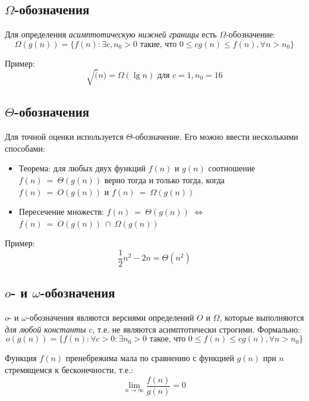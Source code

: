 \documentclass[a4paper,11pt]{article}
\begin{document}
\subsection{$\Omega$-обозначения}

Для определения \emph{асимптотическую нижней границы} есть $\Omega$-обозначение:
\begin{equation*}
  \Omega(g(n)) = \{f(n): \exists c, n_0 > 0 \text{ такие, что }
  0 \leqslant c g(n) \leqslant f(n), \forall n > n_0
  \}
\end{equation*}

Пример:
\begin{equation*}
  \sqrt(n) = \Omega(\lg n) \text{ для } c = 1, n_0 = 16
\end{equation*}

\subsection{$\Theta$-обозначения}

Для точной оценки используется $\Theta$-обозначение. Его можно ввести
несколькими способами:
\begin{itemize}
\item Теорема: для любых двух функций $f(n)$ и $g(n)$ соотношение
  $f(n)~=~\Theta(g(n))$ верно тогда и только тогда, когда $f(n)~=~O(g(n))$ и
  $f(n)~=~\Omega(g(n))$
\item Пересечение множеств: 
  $f(n)~=~\Theta(g(n))$ $\iff$ $f(n)~=~O(g(n))~\cap~\Omega(g(n))$
\end{itemize}

Пример:
\begin{equation*}
  \frac{1}{2}n^2 - 2n = \Theta(n^2)
\end{equation*}

\subsection{$o$- и $\omega$-обозначения}

$o$- и $\omega$-обозначения являются версиями определений $O$ и $\Omega$,
которые выполняются \emph{для любой константы $c$}, т.е. не являются
асимптотически строгими. Формально:
\begin{equation*}
  o(g(n)) = \{f(n): \forall c > 0: \exists n_0 > 0 \text{ такое, что }
  0 \leqslant f(n) \leqslant c g(n), \forall n > n_0
  \}
\end{equation*}

Функция $f(n)$ пренебрежима мала по сравнению с функцией $g(n)$ при $n$
стремящемся к бесконечности, т.е.: 
\begin{equation*}
  \lim_{n\to\infty}\frac{f(n)}{g(n)} = 0
\end{equation*}
\end{document}
